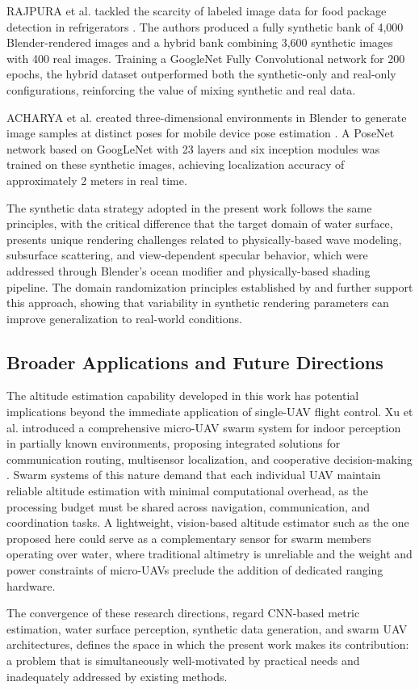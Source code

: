     RAJPURA et al. tackled the scarcity of labeled image data for food package detection in refrigerators \cite{ObjetoSintetico}.
    The authors produced a fully synthetic bank of 4,000 Blender-rendered images and a hybrid bank combining 3,600 synthetic images with 400 real images.
    Training a GoogleNet Fully Convolutional network for 200 epochs, the hybrid dataset outperformed both the synthetic-only and real-only configurations, reinforcing the value of mixing synthetic and real data.

    ACHARYA et al. created three-dimensional environments in Blender to generate image samples at distinct poses for mobile device pose estimation \cite{BlenderMapa}.
    A PoseNet network based on GoogLeNet with 23 layers and six inception modules was trained on these synthetic images, achieving localization accuracy of approximately 2 meters in real time.

    The synthetic data strategy adopted in the present work follows the same principles, with the critical difference that the target domain of water surface, presents unique rendering challenges related to physically-based wave modeling, subsurface scattering, and view-dependent specular behavior, which were addressed through Blender's ocean modifier and physically-based shading pipeline.
    The domain randomization principles established by \cite{Tobin2017} and \cite{Tremblay2018} further support this approach, showing that variability in synthetic rendering parameters can improve generalization to real-world conditions.

    \subsection{Broader Applications and Future Directions}

    The altitude estimation capability developed in this work has potential implications beyond the immediate application of single-UAV flight control.
    Xu et al. introduced a comprehensive micro-UAV swarm system for indoor perception in partially known environments, proposing integrated solutions for communication routing, multisensor localization, and cooperative decision-making \cite{XuMicroUAVSwarm2025}.
    Swarm systems of this nature demand that each individual UAV maintain reliable altitude estimation with minimal computational overhead, as the processing budget must be shared across navigation, communication, and coordination tasks.
    A lightweight, vision-based altitude estimator such as the one proposed here could serve as a complementary sensor for swarm members operating over water, where traditional altimetry is unreliable and the weight and power constraints of micro-UAVs preclude the addition of dedicated ranging hardware.

    The convergence of these research directions, regard CNN-based metric estimation, water surface perception, synthetic data generation, and swarm UAV architectures, defines the space in which the present work makes its contribution: a problem that is simultaneously well-motivated by practical needs and inadequately addressed by existing methods.